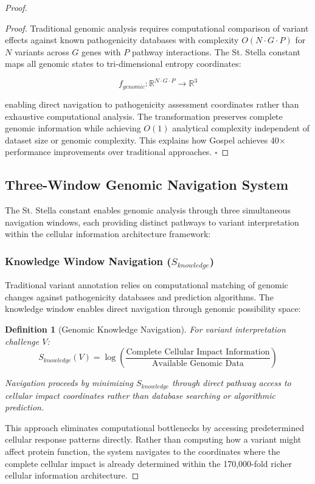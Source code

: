 \documentclass[12pt,a4paper]{article}
\newtheorem{definition}[theorem]{Definition}
\begin{document}
\begin{proof}
\begin{proof}
Traditional genomic analysis requires computational comparison of variant effects against known pathogenicity databases with complexity $O(N \cdot G \cdot P)$ for $N$ variants across $G$ genes with $P$ pathway interactions. The St. Stella constant maps all genomic states to tri-dimensional entropy coordinates:

$$f_{genomic}: \mathbb{R}^{N \cdot G \cdot P} \rightarrow \mathbb{R}^3$$

enabling direct navigation to pathogenicity assessment coordinates rather than exhaustive computational analysis. The transformation preserves complete genomic information while achieving $O(1)$ analytical complexity independent of dataset size or genomic complexity. This explains how Gospel achieves 40× performance improvements over traditional approaches. $\square$
\end{proof}

\subsection{Three-Window Genomic Navigation System}

The St. Stella constant enables genomic analysis through three simultaneous navigation windows, each providing distinct pathways to variant interpretation within the cellular information architecture framework:

\subsubsection{Knowledge Window Navigation ($S_{knowledge}$)}

Traditional variant annotation relies on computational matching of genomic changes against pathogenicity databases and prediction algorithms. The knowledge window enables direct navigation through genomic possibility space:

\begin{definition}[Genomic Knowledge Navigation]
For variant interpretation challenge $V$:
$$S_{knowledge}(V) = \log\left(\frac{\text{Complete Cellular Impact Information}}{\text{Available Genomic Data}}\right)$$

Navigation proceeds by minimizing $S_{knowledge}$ through direct pathway access to cellular impact coordinates rather than database searching or algorithmic prediction.
\end{definition}

This approach eliminates computational bottlenecks by accessing predetermined cellular response patterns directly. Rather than computing how a variant might affect protein function, the system navigates to the coordinates where the complete cellular impact is already determined within the 170,000-fold richer cellular information architecture.


\end{proof}
\end{document}
